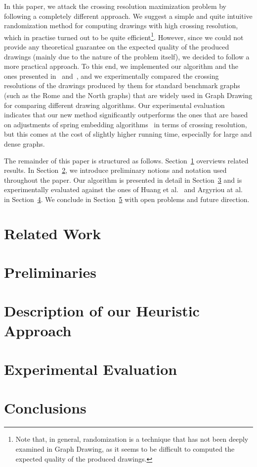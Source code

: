 \documentclass{llncs}
\begin{document}
In this paper, we attack the crossing resolution maximization problem by following a completely different approach. We suggest a simple and quite intuitive randomization method for computing drawings with high crossing resolution, which in practise turned out to be quite efficient\footnote{Note that, in general, randomization is a technique that has not been deeply examined in Graph Drawing, as it seems to be difficult to computed the expected quality of the produced drawings.}. However, since we could not provide any theoretical guarantee on the expected quality of the produced drawings (mainly due to the nature of the problem itself), we decided to follow a more practical approach. To this end, we implemented our algorithm and the ones presented in~\cite{DBLP:journals/vlc/HuangEHL13} and~\cite{DBLP:journals/cj/ArgyriouBS13}, and we experimentally compared the crossing resolutions of the drawings produced by them for standard benchmark graphs (such as the Rome and the North graphs) that are widely used in Graph Drawing for comparing different drawing algorithms. Our experimental evaluation indicates that our new method significantly outperforms the ones that are based on adjustments of spring embedding algorithms~\cite{DBLP:journals/vlc/HuangEHL13,DBLP:journals/cj/ArgyriouBS13} in terms of crossing resolution, but this comes at the cost of slightly higher running time, especially for large and dense graphs. 

The remainder of this paper is structured as follows. Section~\ref{sec:relatedwork} overviews related results. In Section~\ref{sec:preliminaries}, we introduce preliminary notions and notation used throughout the paper. Our algorithm is presented in detail in Section~\ref{sec:algorithm} and is experimentally evaluated against the ones of Huang et al.~\cite{DBLP:journals/vlc/HuangEHL13} and Argyriou at al.~\cite{DBLP:journals/cj/ArgyriouBS13} in Section~\ref{sec:experiments}. We conclude in Section~\ref{sec:conclusions} with open problems and future direction.
 
\section{Related Work}
\label{sec:relatedwork}

\section{Preliminaries}
\label{sec:preliminaries}

\section{Description of our Heuristic Approach}
\label{sec:algorithm}


\section{Experimental Evaluation}
\label{sec:experiments}


\section{Conclusions}
\label{sec:conclusions}



\end{document}
